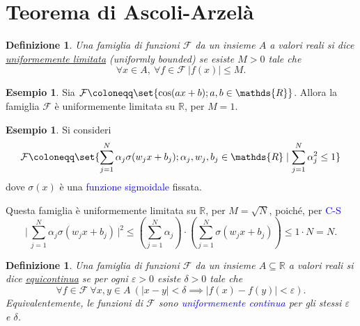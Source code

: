 \documentclass[10pt]{book}
\newcommand{\1}{\mathds{1}}
\newcommand{\R}{\mathds{R}}
\theoremstyle{definition}%
\newtheorem{esempio}[thm]{Esempio}
\theoremstyle{plain}
\newtheorem{definizione}[thm]{Definizione}
\theoremstyle{remark}
\renewcommand{\href}[2]{\textcolor{blue}{#2}}
\begin{document}
\section{Teorema di Ascoli-Arzelà}
\label{sec:orge3de8a5}

\begin{definizione}
Una famiglia di funzioni \(\mathcal{F}\) da un insieme \(A\) a valori reali si dice \uline{uniformemente limitata} (\emph{uniformly bounded}) se esiste \(M > 0\) tale che
\begin{equation*}
\forall x \in A,\ \forall f \in \mathcal{F}\ |f(x)|\le M.
\end{equation*}
\end{definizione}

\begin{esempio}
Sia \(\mathcal{F} \coloneqq \set{\cos(ax+b); a,b \in \R}\). Allora la famiglia \(\mathcal{F}\) è uniformemente limitata su \(\R\), per \(M=1\).
\end{esempio}

\begin{esempio}
Si consideri
\begin{equation*}
\mathcal{F}\coloneqq \set{\sum_{j=1}^{N} \alpha_{j}\sigma(w_{j}x+b_{j}); \alpha_{j}, w_{j}, b_{j} \in \R\mid \sum_{j=1}^{N}\alpha_{j}^{2} \le 1}
\end{equation*}
dove \(\sigma(x)\) è una \href{../../../../../org/roam/20250625110110-funzione_sigmoidale.org}{funzione sigmoidale} fissata.

Questa famiglia è uniformemente limitata su \(\R\), per \(M=\sqrt{N}\), poiché, per \href{../../../../../org/roam/20250629112810-disuguaglianza_di_cauchy_schwarz.org}{C-S}
\begin{equation*}
\bigg\lvert\,\sum_{j=1}^{N}\alpha_{j}\sigma(w_{j}x+b_{j})\,\bigg\rvert^{2}\le \left(\sum_{j=1}^{N}\alpha_{j}\right)\cdot\left(\sum_{j=1}^{N}\sigma(w_{j}x+b_{j})\right)\le 1\cdot N=N.
\end{equation*}
\end{esempio}
\begin{definizione}
Una famiglia di funzioni \(\mathcal{F}\) da un insieme \(A \subseteq \R\) a valori reali si dice \uline{equicontinua} se per ogni \(\varepsilon>0\) esiste \(\delta>0\) tale che
\begin{equation*}
\forall f \in \mathcal{F}\ \forall x,y \in A\ \left(|x-y|<\delta\implies |f(x)-f(y)|<\varepsilon\right).
\end{equation*}
Equivalentemente, le funzioni di \(\mathcal{F}\) sono \href{../../../../../org/roam/20250611135127-funzione_uniformemente_continua.org}{uniformemente continua} per gli stessi \(\varepsilon\) e \(\delta\).
\end{definizione}
\end{document}
